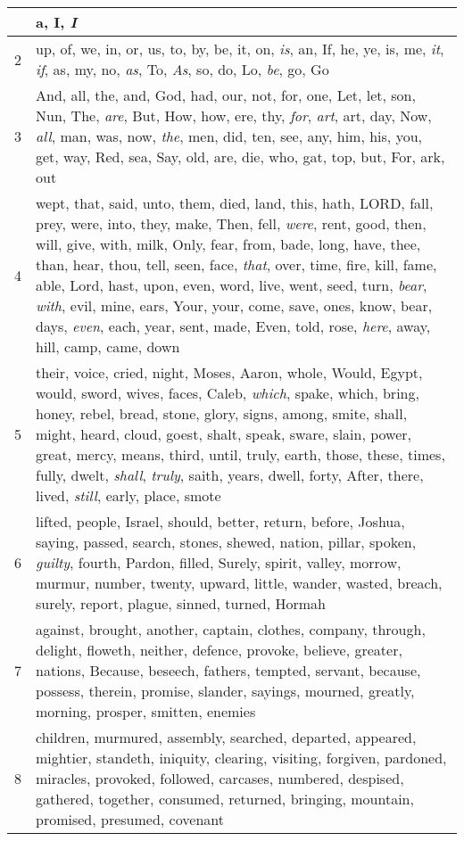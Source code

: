 \begin{longtable}{l|p{3.75in}}
\hline \hline
\endlastfoot
1 & a, I, \emph{I} \\ \hline
2 & up, of, we, in, or, us, to, by, be, it, on, \emph{is}, an, If, he, ye, is, me, \emph{it}, \emph{if}, as, my, no, \emph{as}, To, \emph{As}, so, do, Lo, \emph{be}, go, Go \\ \hline
3 & And, all, the, and, God, had, our, not, for, one, Let, let, son, Nun, The, \emph{are}, But, How, how, ere, thy, \emph{for}, \emph{art}, art, day, Now, \emph{all}, man, was, now, \emph{the}, men, did, ten, see, any, him, his, you, get, way, Red, sea, Say, old, are, die, who, gat, top, but, For, ark, out \\ \hline
4 & wept, that, said, unto, them, died, land, this, hath, LORD, fall, prey, were, into, they, make, Then, fell, \emph{were}, rent, good, then, will, give, with, milk, Only, fear, from, bade, long, have, thee, than, hear, thou, tell, seen, face, \emph{that}, over, time, fire, kill, fame, able, Lord, hast, upon, even, word, live, went, seed, turn, \emph{bear}, \emph{with}, evil, mine, ears, Your, your, come, save, ones, know, bear, days, \emph{even}, each, year, sent, made, Even, told, rose, \emph{here}, away, hill, camp, came, down \\ \hline
5 & their, voice, cried, night, Moses, Aaron, whole, Would, Egypt, would, sword, wives, faces, Caleb, \emph{which}, spake, which, bring, honey, rebel, bread, stone, glory, signs, among, smite, shall, might, heard, cloud, goest, shalt, speak, sware, slain, power, great, mercy, means, third, until, truly, earth, those, these, times, fully, dwelt, \emph{shall}, \emph{truly}, saith, years, dwell, forty, After, there, lived, \emph{still}, early, place, smote \\ \hline
6 & lifted, people, Israel, should, better, return, before, Joshua, saying, passed, search, stones, shewed, nation, pillar, spoken, \emph{guilty}, fourth, Pardon, filled, Surely, spirit, valley, morrow, murmur, number, twenty, upward, little, wander, wasted, breach, surely, report, plague, sinned, turned, Hormah \\ \hline
7 & against, brought, another, captain, clothes, company, through, delight, floweth, neither, defence, provoke, believe, greater, nations, Because, beseech, fathers, tempted, servant, because, possess, therein, promise, slander, sayings, mourned, greatly, morning, prosper, smitten, enemies \\ \hline
8 & children, murmured, assembly, searched, departed, appeared, mightier, standeth, iniquity, clearing, visiting, forgiven, pardoned, miracles, provoked, followed, carcases, numbered, despised, gathered, together, consumed, returned, bringing, mountain, promised, presumed, covenant \\ \hline

\end{longtable}
